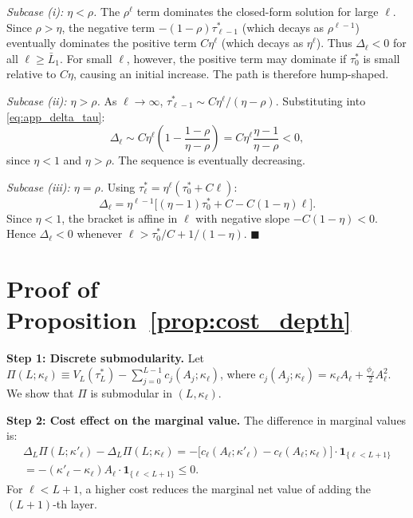 \textit{Subcase (i): $\eta < \rho$.} The $\rho^{\ell}$ term dominates the closed-form solution for large $\ell$. Since $\rho > \eta$, the negative term $-(1-\rho)\tau^{*}_{\ell-1}$ (which decays as $\rho^{\ell-1}$) eventually dominates the positive term $C\eta^{\ell}$ (which decays as $\eta^{\ell}$). Thus $\Delta_{\ell} < 0$ for all $\ell \geq \bar{L}_1$. For small $\ell$, however, the positive term may dominate if $\tau^{*}_{0}$ is small relative to $C\eta$, causing an initial increase. The path is therefore hump-shaped.

\textit{Subcase (ii): $\eta > \rho$.} As $\ell \to \infty$, $\tau^{*}_{\ell-1} \sim C\eta^{\ell}/(\eta-\rho)$. Substituting into \eqref{eq:app_delta_tau}:
\begin{equation*}
\Delta_{\ell} \sim C\eta^{\ell}\left(1 - \frac{1-\rho}{\eta-\rho}\right) = C\eta^{\ell}\frac{\eta - 1}{\eta - \rho} < 0,
\end{equation*}
since $\eta < 1$ and $\eta > \rho$. The sequence is eventually decreasing.

\textit{Subcase (iii): $\eta = \rho$.} Using $\tau^{*}_{\ell} = \eta^{\ell}(\tau^{*}_{0} + C\ell)$:
\begin{equation*}
\Delta_{\ell} = \eta^{\ell-1}\bigl[(\eta-1)\tau^{*}_{0} + C - C(1-\eta)\ell\bigr].
\end{equation*}
Since $\eta < 1$, the bracket is affine in $\ell$ with negative slope $-C(1-\eta) < 0$. Hence $\Delta_{\ell} < 0$ whenever $\ell > \tau^{*}_{0}/C + 1/(1-\eta)$. \hfill $\blacksquare$

\section{Proof of Proposition~\ref{prop:cost_depth}}
\label{app:proof_prop6}

\textbf{Step 1: Discrete submodularity.} Let $\Pi(L; \kappa_\ell) \equiv V_L(\tau^*_L) - \sum_{j=0}^{L-1} c_j(A_j; \kappa_\ell)$, where $c_j(A_j; \kappa_\ell) = \kappa_\ell A_\ell + \frac{\phi_\ell}{2} A_\ell^2$. We show that $\Pi$ is submodular in $(L, \kappa_\ell)$.

\textbf{Step 2: Cost effect on the marginal value.} The difference in marginal values is:
\begin{multline*}
\Delta_L \Pi(L; \kappa'_\ell) - \Delta_L \Pi(L; \kappa_\ell) = -\bigl[c_\ell(A_\ell; \kappa'_\ell) - c_\ell(A_\ell; \kappa_\ell)\bigr] \cdot \mathbf{1}_{\{\ell < L+1\}} \\
= -(\kappa'_\ell - \kappa_\ell) A_\ell \cdot \mathbf{1}_{\{\ell < L+1\}} \leq 0.
\end{multline*}
For $\ell < L+1$, a higher cost reduces the marginal net value of adding the $(L+1)$-th layer.

